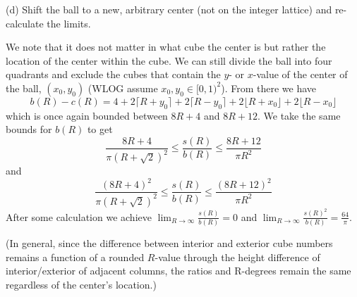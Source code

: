 \documentclass{amsart}
\begin{document}
\bigskip

\indent (d) Shift the ball to a new, arbitrary center (not on the integer lattice) and re-calculate the limits.

We note that it does not matter in what cube the center is but rather the location of the center within the cube. We can still divide the ball into four
quadrants and exclude the cubes that contain the $y$- or $x$-value of the center of the ball, $(x_0, y_0)$ (WLOG assume $x_0, y_0\in[0,1)^2$). From there we have 
$$b(R)-c(R)=4+2\lceil R+y_0\rceil +2\lceil R-y_0\rceil +2\lfloor R+x_0\rfloor +2\lfloor R-x_0\rfloor$$ which is once again bounded between $8R+4$ and $8R+12$. 
We take the same bounds for $b(R)$ to get $$\frac{8R+4}{\pi(R+\sqrt{2})^2}\leq \frac{s(R)}{b(R)}\leq \frac{8R+12}{\pi R^2}$$ and 
$$\frac{(8R+4)^2}{\pi(R+\sqrt{2})^2}\leq \frac{s(R)}{b(R)}\leq \frac{(8R+12)^2}{\pi R^2}$$ After some calculation we achieve $\lim_{R\rightarrow\infty}\frac{s(R)}{b(R)}=0$ and $\lim_{R\rightarrow\infty}\frac{s(R)^2}{b(R)}=\frac{64}{\pi}$. 

(In general, since the difference between interior and exterior cube numbers remains a function of a rounded $R$-value through the height difference of interior/exterior of adjacent columns,
the ratios and R-degrees remain the same regardless of the center's location.)
\end{document}
